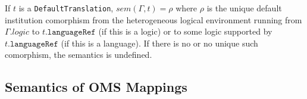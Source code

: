 \documentclass[10pt,fleqn,final]{scrreprt}
\makeatletter
\newcommand*\CommentAuthor{}
\renewcommand*\CommentAuthor{#1}}
\newcommand*\CommentDate{}
\renewcommand*\CommentDate{#1}}
\newcommand*\CommentId{}
\renewcommand*\CommentId{#1}}
\newcommand*\CommentType{}
\renewcommand*\CommentType{#1}}
\newcommand*{\SetCommentColorByType}[1]{%
\edef\localType{{#1}}%
\expandafter\ifstrequal\localType{q-aut}{\colorlet{CommentColor}{red}}{%
\expandafter\ifstrequal\localType{q-all}{\colorlet{CommentColor}{orange}}{%
\expandafter\ifstrequal\localType{todo}{\colorlet{CommentColor}{orange}}{%
\expandafter\ifstrequal\localType{fyi}{\colorlet{CommentColor}{lightgray}}{%
\colorlet{CommentColor}{yellow}}}}}}
\newcommand*{\SetCommentPrefixByType}[1]{%
\edef\localType{{#1}}%
\expandafter\@ifmtarg\localType{%
\edef\CommentPrefix{}%
}{%
\caseupper[q]{#1}%
\edef\CommentPrefix{\thestring: }%
}}
\newcommand*{\initComment}[1]{%
\setkeys{Comment}{#1}%
\SetCommentColorByType{\CommentType}%
\relax%
\SetCommentPrefixByType{\CommentType}%
\relax%
}
\newcommand*{\todonote}[2][]{%
\initComment{#1}%
\pdfcomment[author=\CommentAuthor,color=CommentColor,date=\CommentDate,id=\CommentId]{%
\CommentPrefix
#2}}
\renewcommand*{\todonote}[2][]{%
\initComment{#1}%
\ednote{\CommentPrefix #2}}
\newcommand*{\CLnote}[2][author=Christoph Lange]{%
\todonote[author=Christoph Lange,#1]{#2} 
}
\newcommand*{\syntax}[1]{\texttt{#1}}
\newcommand{\ssclause}[1]{\subsection{#1}}
\newenvironment{definitions}[0]{\medskip }{}
\makeatother
\begin{document}
\begin{definitions}
If $t$ is a \syntax{DefaultTranslation},
$sem(\Gamma, t)=\rho$ where $\rho$ is the
unique default institution comorphism from the heterogeneous logical
environment running from $\Gamma.logic$ to $t.\syntax{languageRef}$ (if this is a
logic) or to some logic supported by $t.\syntax{languageRef}$ (if this
is a language). If there is no or no unique such comorphism, the
semantics is undefined. 

\ssclause{Semantics of OMS Mappings}\label{sec:oms-mappings}


\end{definitions}
\end{document}
